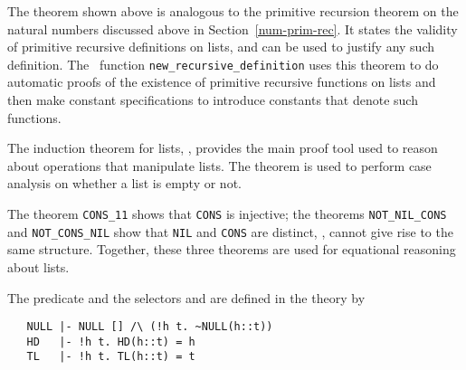 The theorem  shown above is analogous to the primitive
recursion theorem on the
natural numbers discussed above in Section~\ref{num-prim-rec}.  It
states the validity of primitive recursive definitions on lists, and
can be used to justify any such definition.  The \ML\ function
{\small\verb+new_recursive_definition+} uses this theorem to do
automatic  proofs of the existence
of primitive recursive functions on lists and then make constant
specifications to introduce constants that denote such functions.

The induction theorem for lists, , provides the main
proof tool used to reason about operations that manipulate lists. The
theorem  is used to perform case analysis on whether a
list is empty or not.

The theorem {\small\verb+CONS_11+} shows that {\small\verb+CONS+} is injective;
the theorems {\small\verb+NOT_NIL_CONS+} and {\small\verb+NOT_CONS_NIL+} show that
{\small\verb+NIL+} and {\small\verb+CONS+} are distinct, \ie,
cannot give rise to the same structure. Together, these three theorems
are used for equational reasoning about lists.

The predicate  and the selectors  and  are
defined
in the theory  by
%
\begin{hol}
{\small
\begin{verbatim}
   NULL |- NULL [] /\ (!h t. ~NULL(h::t))
   HD   |- !h t. HD(h::t) = h
   TL   |- !h t. TL(h::t) = t
\end{verbatim}}
\end{hol}

